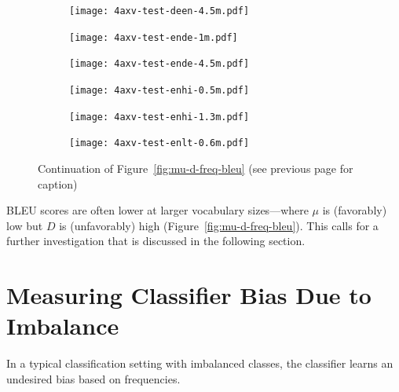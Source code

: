 \begin{figure}[h!t]
\ContinuedFloat
\centering

\begin{subfigure}{\textwidth}
  \centering
  \texttt{[image: 4axv-test-deen-4.5m.pdf]}
\end{subfigure}

\vspace{2mm}

\begin{subfigure}{.45\textwidth}
  \centering
  \texttt{[image: 4axv-test-ende-1m.pdf]}
\end{subfigure}
\begin{subfigure}{.45\textwidth}
  \centering
  \texttt{[image: 4axv-test-ende-4.5m.pdf]}
\end{subfigure}


\begin{subfigure}{.45\textwidth}
  \centering
  \texttt{[image: 4axv-test-enhi-0.5m.pdf]}
\end{subfigure}
\begin{subfigure}{.45\textwidth}
  \centering
  \texttt{[image: 4axv-test-enhi-1.3m.pdf]}
\end{subfigure}

\begin{subfigure}{.54\textwidth}
  \centering
  \texttt{[image: 4axv-test-enlt-0.6m.pdf]}
\end{subfigure}

\caption{Continuation of Figure~\ref{fig:mu-d-freq-bleu} (see previous page for caption)}
\label{fig:mu-d-freq-bleu-continued}
\end{figure}

BLEU scores are often lower at larger vocabulary sizes---where $\mu$ is (favorably) low but $D$ is (unfavorably) high (Figure~\ref{fig:mu-d-freq-bleu}). This calls for a further investigation that is discussed in the following section.

\section{Measuring Classifier Bias Due to Imbalance}
\label{sec:class-bias}

In a typical classification setting with imbalanced classes, the classifier learns an undesired bias based on frequencies. 


